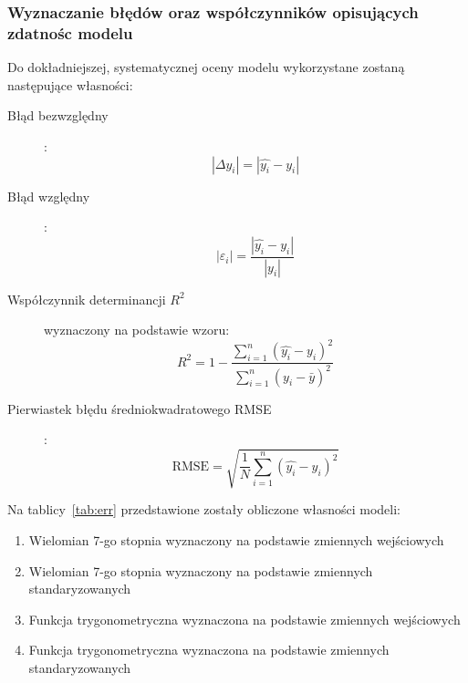 \documentclass[a4paper, 12pt]{mwart}
\begin{document}
			\subsubsection{Wyznaczanie błędów oraz współczynników opisujących zdatnośc modelu}
				Do dokładniejszej, systematycznej oceny modelu wykorzystane zostaną następujące własności:

				\begin{description}
					\item[Błąd bezwzględny]: $$|\Delta y_i| = |\hat{y_i}-y_i|$$
					\item[Błąd względny]: $$|\varepsilon_i|=\frac{|\hat{y_i}-y_i|}{|y_i|}$$
					\item[Współczynnik determinancji $R^2$] wyznaczony na podstawie wzoru:
						$$ R^2 = 1-\frac{\displaystyle\sum_{i=1}^n \left(\hat{y_i} - y_i\right)^2}
						{\displaystyle\sum_{i=1}^n \left(y_i - \bar{y}\right)^2} $$ 
					\item[Pierwiastek błędu średniokwadratowego RMSE]:
						$$\text{RMSE} = \sqrt{\frac{1}{N} \sum_{i=1}^n (\hat{y_i} - y_i)^2}$$ 
				\end{description}

				Na tablicy~\ref{tab:err} przedstawione zostały obliczone własności modeli:
				\begin{enumerate}
					\item Wielomian 7-go stopnia wyznaczony na podstawie zmiennych wejściowych
					\item Wielomian 7-go stopnia wyznaczony na podstawie zmiennych standaryzowanych
					\item Funkcja trygonometryczna wyznaczona na podstawie zmiennych wejściowych
					\item Funkcja trygonometryczna wyznaczona na podstawie zmiennych standaryzowanych
				\end{enumerate}
\end{document}
